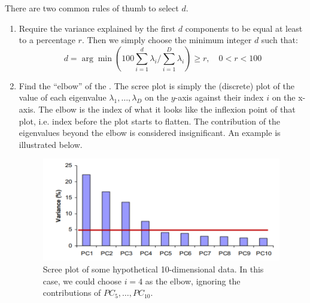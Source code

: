 \documentclass[a4paper]{article}
\begin{document}
There are two common rules of thumb to select $d$.
\begin{enumerate}
    \item Require the variance explained by the first $d$ components to be equal at least to a percentage $r$. Then we simply choose the minimum integer $d$ such that:
    \[
    d=\arg \min\left(100\sum\limits_{i=1}^d\lambda_i/\sum\limits_{i=1}^D \lambda_i\right) \geq r, \quad 0 < r < 100 
    \]
    \item Find the ``elbow'' of the . The scree plot is simply the (discrete) plot of the value of each eigenvalue $\lambda_1,\ldots,\lambda_D$ on the $y$-axis against their index $i$ on the x-axis. The elbow is the index of what it looks like the inflexion point of that plot, i.e. index before the plot starts to flatten. The contribution of the eigenvalues beyond the elbow is considered insignificant. An example is illustrated below.
    \begin{figure}[H]
        \centering
        \includegraphics[height=4.5cm]{img/scree_plot.PNG}
        \caption{Scree plot of some hypothetical 10-dimensional data. In this case, we could choose $i=4$ as the elbow, ignoring the contributions of $PC_5,\ldots,PC_{10}$.}
        \label{fig:my_label}
    \end{figure}
\end{enumerate}
\end{document}
